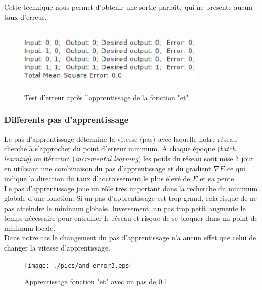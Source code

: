 \documentclass[twoside,openright,a4paper,11pt,french]{article}
\begin{document}
Cette technique nous permet d'obtenir une sortie parfaite qui ne présente
aucun taux d'erreur.



\begin{figure}[ht]
\centering
\includegraphics[width=9cm,height=3.2cm]{./pics/andtest2.eps}
\caption{Test d'erreur après l'apprentissage de la fonction "et"}
\label{fig:andtest2}
\end{figure}


\subsubsection{Differents pas d'apprentissage}

Le pas d'apprentissage détermine la vitesse (pas) avec laquelle notre réseau
cherche à s'approcher du point d'erreur minimum. 
A chaque époque ({\it batch learning}) ou itération ({\it incremental
learning}) les poids du réseau sont mise à jour en utilisant une combinaison du
pas d'apprentissage et du gradient $\nabla E$ ce qui indique la direction du taux
d'accroissement le plus élevé de $E$ et sa pente.\\

Le pas d'apprentissage joue un rôle très important dans la recherche du
minimum globale d'une fonction. 
Si un pas d'apprentissage est trop grand, cela risque de ne pas atteindre le minimum globale.
Inversement, un pas trop petit augmente le temps nécessaire pour entrainer le réseau et risque de
se bloquer dans un point de minimum locale.\\

Dans notre cas le changement du pas d'apprentissage n'a aucun effet que celui 
de changer la vitesse d'apprentissage.


\begin{figure}[ht]
\centering
\texttt{[image: ./pics/and\_error3.eps]}
\caption{Apprentissage fonction "et" avec un pas de 0.1}
\label{fig:anderr3}
\end{figure}
\end{document}
